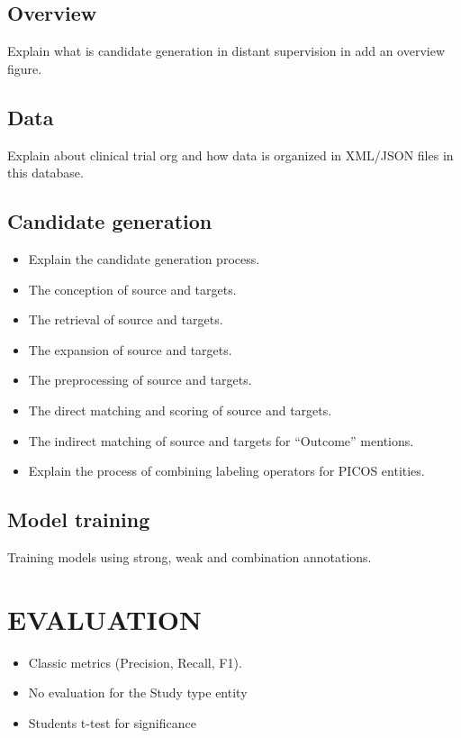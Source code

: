 \documentclass[10.7pt,]{article}
\begin{document}
\subsection{Overview}\label{overview}
Explain what is candidate generation in distant supervision in add an overview figure.
%
%
%
\subsection{Data}\label{data}
Explain about clinical trial org and how data is organized in XML/JSON files in this database.
%
%
%
\subsection{Candidate generation}\label{candgen}

\begin{itemize}
    \item Explain the candidate generation process.
    \item The conception of source and targets.
    \item The retrieval of source and targets.
    \item The expansion of source and targets.
    \item The preprocessing of source and targets.
    \item The direct matching and scoring of source and targets.
    \item The indirect matching of source and targets for ``Outcome'' mentions.
    \item Explain the process of combining labeling operators for PICOS entities.
\end{itemize}
%
%
%
\subsection{Model training}\label{modtrain}
Training models using strong, weak and combination annotations.
%
%
%
\section{EVALUATION}\label{eval}
\begin{itemize}
    \item Classic metrics (Precision, Recall, F1).
    \item No evaluation for the Study type entity
    \item Students t-test for significance
\end{itemize}
%
%
%
\end{document}
